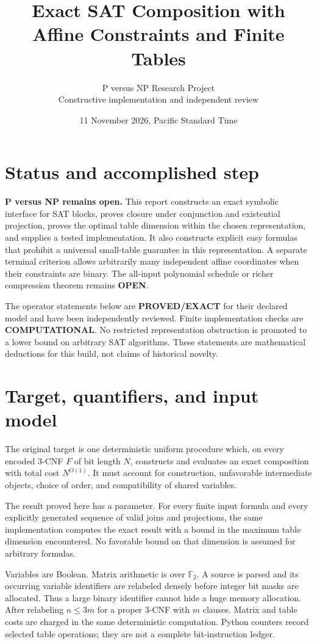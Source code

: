 \documentclass[11pt]{article}
\title{Exact SAT Composition with Affine Constraints and Finite Tables}
\author{P versus NP Research Project\\Constructive implementation and independent review}
\date{11 November 2026, Pacific Standard Time}
\newcommand{\F}{\mathbb F_2}
\begin{document}
\maketitle

\section*{Status and accomplished step}
\noindent\textbf{P versus NP remains open.} This report constructs an exact symbolic
interface for SAT blocks, proves closure under conjunction and existential projection,
proves the optimal table dimension within the chosen representation, and supplies a
tested implementation. It also constructs explicit easy formulas that prohibit a
universal small-table guarantee in this representation. A separate terminal criterion
allows arbitrarily many independent affine coordinates when their constraints are
binary. The all-input polynomial schedule or richer compression theorem remains
\textbf{OPEN}.

The operator statements below are \textbf{PROVED/EXACT} for their declared model and
have been independently reviewed. Finite implementation checks are
\textbf{COMPUTATIONAL}. No restricted representation obstruction is promoted to a
lower bound on arbitrary SAT algorithms. These statements are mathematical deductions
for this build, not claims of historical novelty.

\section{Target, quantifiers, and input model}
The original target is one deterministic uniform procedure which, on every encoded
3-CNF $F$ of bit length $N$, constructs and evaluates an exact composition with total
cost $N^{O(1)}$. It must account for construction, unfavorable intermediate objects,
choice of order, and compatibility of shared variables.

The result proved here has a parameter. For every finite input formula and every
explicitly generated sequence of valid joins and projections, the same implementation
computes the exact result with a bound in the maximum table dimension encountered.
No favorable bound on that dimension is assumed for arbitrary formulas.

Variables are Boolean. Matrix arithmetic is over $\F$. A source is parsed and its
occurring variable identifiers are relabeled densely before integer bit masks are
allocated. Thus a large binary identifier cannot hide a huge memory allocation.
After relabeling $n\le 3m$ for a proper 3-CNF with $m$ clauses. Matrix and table costs
are charged in the same deterministic computation. Python counters record selected
table operations; they are not a complete bit-instruction ledger.
\end{document}
